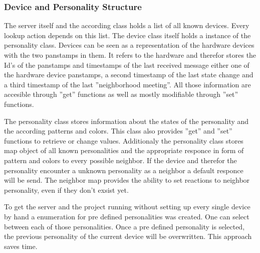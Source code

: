 \subsubsection{Device and Personality Structure}
The server itself and the according class holds a list of all known devices. Every lookup action depends on this list. The device class itself holds a instance of the personality class.
Devices can be seen as a representation of the hardware devices with the two panstamps in them. It refers to the hardware and therefor stores the Id's of the panstamps and timestamps of the last received message either one of the hardware device panstamps, a second timestamp of the last state change and a third timestamp of the last ''neighborhood meeting''. All those information are accesible through ''get'' functions as well as mostly modifiable through ''set'' functions.

The personality class stores information about the states of the personality and the according patterns and colors. This class also provides ''get'' and ''set'' functions to retrieve or change values. Additionaly the personality class stores map object of all known personalities and the appropriate responce in form of pattern and colors to every possible neighbor. If the device and therefor the personality encounter a unknown personality as a neighbor a default responce will be send. 
The neighbor map provides the ability to set reactions to neighbor personality, even if they don't exsist yet.

To get the server and the project running without setting up every single device by hand a enumeration for pre defined personalities was created. One can select between each of those personalities. Once a pre defined personality is selected, the previous personality of the current device will be overwritten. This approach saves time.

